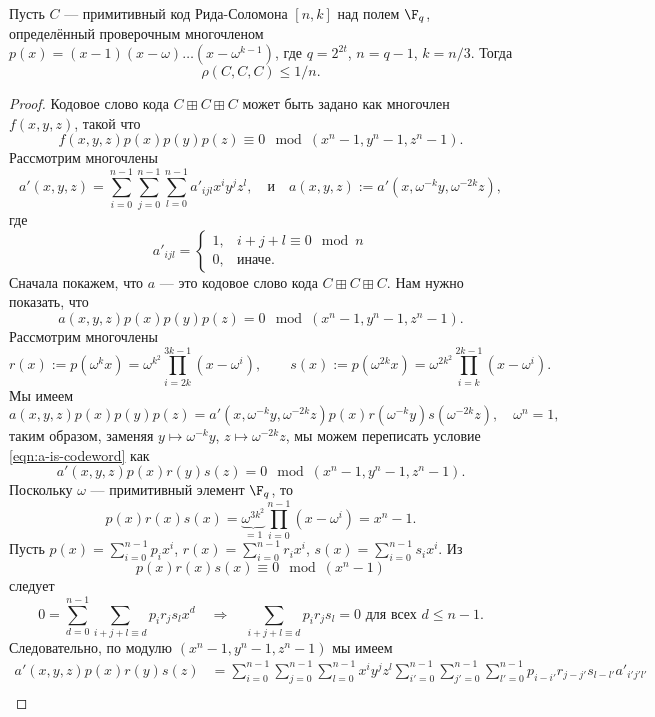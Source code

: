 \documentclass[russian]{intsys}
\begin{document}
\begin{lemma}\label{lemma:not-expanding}
    Пусть $C$ --- примитивный код Рида-Соломона $[n,k]$ над полем $\F_q$, определённый проверочным многочленом $p(x)=(x-1)(x-\omega)\ldots (x-\omega^{k-1})$, где $q=2^{2t}$, $n=q-1$, $k=n/3$. Тогда
    $$\rho(C,C,C) \le 1/n.$$
\end{lemma}
\begin{proof}
    Кодовое слово кода $C\boxplus C\boxplus C$ может быть задано как многочлен 
    $f(x,y,z)$, такой что 
    $$f(x,y,z)p(x)p(y)p(z)\equiv 0\mod (x^n-1,y^n-1,z^n-1).$$ 
    Рассмотрим многочлены 
    $$a'(x,y,z)=\sum_{i=0}^{n-1}\sum_{j=0}^{n-1}\sum_{l=0}^{n-1}a'_{ijl}x^iy^jz^l,\quad\mbox{и}\quad a(x,y,z):=a'(x,\omega^{-k}y,\omega^{-2k}z),$$
    где 
    $$a'_{ijl}=\begin{cases}1,&i+j+l\equiv 0\mod n\\0,&\mbox{иначе}.\end{cases}$$
    Сначала покажем, что $a$ --- это кодовое слово кода $C\boxplus C\boxplus C$. Нам нужно показать, что 
    \begin{equation}\label{eqn:a-is-codeword}
     a(x,y,z)p(x)p(y)p(z)=0\mod (x^n-1,y^n-1,z^n-1).
    \end{equation}
    Рассмотрим многочлены 
    $$r(x):=p(\omega^k x)=\omega^{k^2}\prod_{i=2k}^{3k-1}(x-\omega^i),\qquad s(x):=p(\omega^{2k}x)=\omega^{2k^2}\prod_{i=k}^{2k-1}(x-\omega^i).$$
    Мы имеем \[
        a(x,y,z)p(x)p(y)p(z)=a'(x,\omega^{-k}y,\omega^{-2k}z)p(x)r(\omega^{-k}y)s(\omega^{-2k}z),\quad \omega^n=1,
    \]
    таким образом, заменяя $y\mapsto \omega^{-k}y$, $z\mapsto\omega^{-2k}z$, мы можем переписать условие \eqref{eqn:a-is-codeword} как
    \begin{equation}\label{eqn:a'-is-codeword}
     a'(x,y,z)p(x)r(y)s(z)=0\mod (x^n-1,y^n-1,z^n-1).
    \end{equation}
    Поскольку $\omega$ --- примитивный элемент $\F_q$, то \[
        p(x)r(x)s(x)=\underbrace{\omega^{3k^2}}_{=1}\prod_{i=0}^{n-1}(x-\omega^i)=x^{n}-1.
    \]
    Пусть $p(x)=\sum_{i=0}^{n-1}p_ix^i$, $r(x)=\sum_{i=0}^{n-1}r_ix^i$, $s(x)=\sum_{i=0}^{n-1}s_ix^i$.
    Из \[p(x)r(x)s(x)\equiv 0\mod (x^n-1)\] следует
    $$0=\sum_{d=0}^{n-1}\sum_{i+j+l\equiv d}p_ir_js_lx^d\quad\Longrightarrow\quad \sum_{i+j+l\equiv d}p_ir_js_l=0\mbox{ для всех }d\le n-1.$$
    Следовательно, по модулю $(x^n-1,y^n-1,z^n-1)$ мы имеем
    \begin{align*}
    a'(x,y,z)p(x)r(y)s(z)&=\sum_{i=0}^{n-1}\sum_{j=0}^{n-1}\sum_{l=0}^{n-1}x^iy^jz^l\sum_{i'=0}^{n-1}\sum_{j'=0}^{n-1}\sum_{l'=0}^{n-1} p_{i-i'}r_{j-j'}s_{l-l'}a'_{i'j'l'}\\

\end{align*}
\end{proof}
\end{document}
